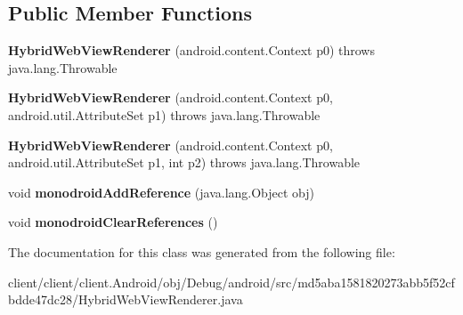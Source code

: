 \subsection*{Public Member Functions}
\begin{DoxyCompactItemize}
\item 
\hypertarget{classmd5aba1581820273abb5f52cfbdde47dc28_1_1HybridWebViewRenderer_ae2c64a67665c07a4415da2d7a04e45e9}{}{\bfseries Hybrid\+Web\+View\+Renderer} (android.\+content.\+Context p0)  throws java.\+lang.\+Throwable 	\label{classmd5aba1581820273abb5f52cfbdde47dc28_1_1HybridWebViewRenderer_ae2c64a67665c07a4415da2d7a04e45e9}

\item 
\hypertarget{classmd5aba1581820273abb5f52cfbdde47dc28_1_1HybridWebViewRenderer_a62a77c2d11878c02a87f7086128e2c2b}{}{\bfseries Hybrid\+Web\+View\+Renderer} (android.\+content.\+Context p0, android.\+util.\+Attribute\+Set p1)  throws java.\+lang.\+Throwable 	\label{classmd5aba1581820273abb5f52cfbdde47dc28_1_1HybridWebViewRenderer_a62a77c2d11878c02a87f7086128e2c2b}

\item 
\hypertarget{classmd5aba1581820273abb5f52cfbdde47dc28_1_1HybridWebViewRenderer_a55745e6a8ca468a7c2307ca70c1805d0}{}{\bfseries Hybrid\+Web\+View\+Renderer} (android.\+content.\+Context p0, android.\+util.\+Attribute\+Set p1, int p2)  throws java.\+lang.\+Throwable 	\label{classmd5aba1581820273abb5f52cfbdde47dc28_1_1HybridWebViewRenderer_a55745e6a8ca468a7c2307ca70c1805d0}

\item 
\hypertarget{classmd5aba1581820273abb5f52cfbdde47dc28_1_1HybridWebViewRenderer_a4237fb78ff9fb89671b32643bbee74b6}{}void {\bfseries monodroid\+Add\+Reference} (java.\+lang.\+Object obj)\label{classmd5aba1581820273abb5f52cfbdde47dc28_1_1HybridWebViewRenderer_a4237fb78ff9fb89671b32643bbee74b6}

\item 
\hypertarget{classmd5aba1581820273abb5f52cfbdde47dc28_1_1HybridWebViewRenderer_a7c5714b677ff3008f3d960adfe468cef}{}void {\bfseries monodroid\+Clear\+References} ()\label{classmd5aba1581820273abb5f52cfbdde47dc28_1_1HybridWebViewRenderer_a7c5714b677ff3008f3d960adfe468cef}

\end{DoxyCompactItemize}


The documentation for this class was generated from the following file\+:\begin{DoxyCompactItemize}
\item 
client/client/client.\+Android/obj/\+Debug/android/src/md5aba1581820273abb5f52cfbdde47dc28/Hybrid\+Web\+View\+Renderer.\+java\end{DoxyCompactItemize}
